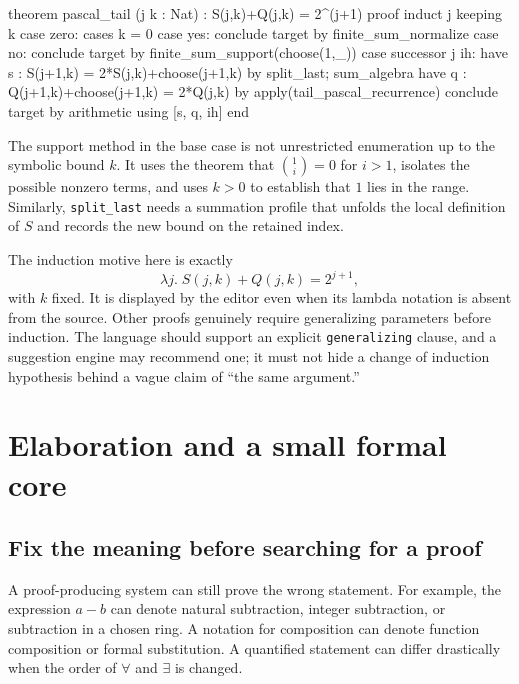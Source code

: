 \documentclass[11pt,a4paper]{article}
\newcommand{\codeid}[1]{\nolinkurl{#1}}
\begin{document}
\par\noindent\begin{minipage}{\linewidth}
\begin{rawcode}
theorem pascal_tail (j k : Nat) : S(j,k)+Q(j,k) = 2^(j+1)
proof
  induct j keeping k
  case zero:
    cases k = 0
    case yes: conclude target by finite_sum_normalize
    case no:  conclude target by finite_sum_support(choose(1,_))
  case successor j ih:
    have s : S(j+1,k) = 2*S(j,k)+choose(j+1,k)
      by split_last; sum_algebra
    have q : Q(j+1,k)+choose(j+1,k) = 2*Q(j,k)
      by apply(tail_pascal_recurrence)
    conclude target by arithmetic using [s, q, ih]
end
\end{rawcode}
\end{minipage}\par

The support method in the base case is not unrestricted enumeration up to the symbolic bound $k$. It uses the theorem that $\binom1i=0$ for $i>1$, isolates the possible nonzero terms, and uses $k>0$ to establish that $1$ lies in the range. Similarly, \codeid{split_last} needs a summation profile that unfolds the local definition of $S$ and records the new bound on the retained index.

The induction motive here is exactly
\[
 \lambda j.\;S(j,k)+Q(j,k)=2^{j+1},
\]
with $k$ fixed. It is displayed by the editor even when its lambda notation is absent from the source. Other proofs genuinely require generalizing parameters before induction. The language should support an explicit \codeid{generalizing} clause, and a suggestion engine may recommend one; it must not hide a change of induction hypothesis behind a vague claim of ``the same argument.''

\section{Elaboration and a small formal core}
\label{sec:core}

\subsection{Fix the meaning before searching for a proof}

A proof-producing system can still prove the wrong statement. For example, the expression $a-b$ can denote natural subtraction, integer subtraction, or subtraction in a chosen ring. A notation for composition can denote function composition or formal substitution. A quantified statement can differ drastically when the order of $\forall$ and $\exists$ is changed.
\end{document}
